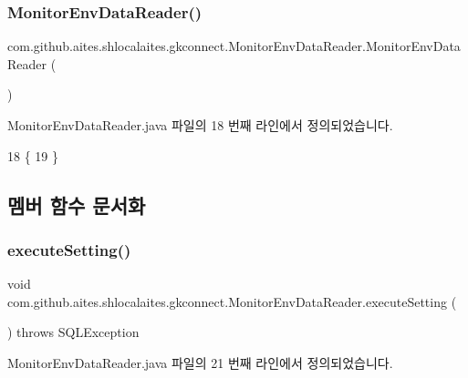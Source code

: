 \subsubsection{\texorpdfstring{Monitor\+Env\+Data\+Reader()}{MonitorEnvDataReader()}}
{\footnotesize\ttfamily com.\+github.\+aites.\+shlocalaites.\+gkconnect.\+Monitor\+Env\+Data\+Reader.\+Monitor\+Env\+Data\+Reader (\begin{DoxyParamCaption}{ }\end{DoxyParamCaption})}



Monitor\+Env\+Data\+Reader.\+java 파일의 18 번째 라인에서 정의되었습니다.


\begin{DoxyCode}
18                                  \{
19     \}
\end{DoxyCode}


\subsection{멤버 함수 문서화}
\mbox{\label{classcom_1_1github_1_1aites_1_1shlocalaites_1_1gkconnect_1_1_monitor_env_data_reader_a3c7abf880200741a416ba05413babd71}} 
\subsubsection{\texorpdfstring{execute\+Setting()}{executeSetting()}}
{\footnotesize\ttfamily void com.\+github.\+aites.\+shlocalaites.\+gkconnect.\+Monitor\+Env\+Data\+Reader.\+execute\+Setting (\begin{DoxyParamCaption}{ }\end{DoxyParamCaption}) throws S\+Q\+L\+Exception}



Monitor\+Env\+Data\+Reader.\+java 파일의 21 번째 라인에서 정의되었습니다.


